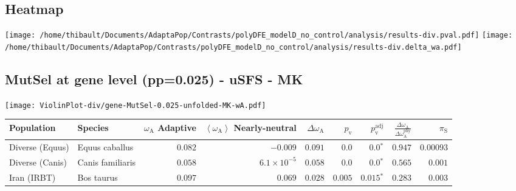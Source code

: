 \subsection{Heatmap} 
\begin{center}
\texttt{[image: /home/thibault/Documents/AdaptaPop/Contrasts/polyDFE\_modelD\_no\_control/analysis/results-div.pval.pdf]} 
\texttt{[image: /home/thibault/Documents/AdaptaPop/Contrasts/polyDFE\_modelD\_no\_control/analysis/results-div.delta\_wa.pdf]} 
\end{center}
\subsection{MutSel at gene level (pp=0.025) - uSFS - MK} 
\begin{center}
\texttt{[image: ViolinPlot-div/gene-MutSel-0.025-unfolded-MK-wA.pdf]} 
\begin{adjustbox}{width = 1\textwidth}
\begin{tabular}{|l|l|r|r|r|r|r|r|r|}
\toprule
                     Population &              Species & \specialcell{$\omega_{\mathrm{A}}$ \\ Adaptive} & \specialcell{$\left< \omega_{\mathrm{A}} \right>$ \\ Nearly-neutral} & $\Delta \omega_{\mathrm{A}} $ & $p_{\mathrm{v}}$ & $p_{\mathrm{v}}^{\mathrm{adj}}$ & $\frac{\Delta\omega_{\mathrm{A}}}{\Delta\omega_{\mathrm{A}}^{\mathrm{phy}}}$ & $\pi_{\textrm{S}}$ \\
\midrule
                Diverse (Equus) &       Equus caballus &                                        $ 0.082$ &                                           $-0.009$ &                      $ 0.091$ &            $0.0$ &                  $\bm{0.0{^*}}$ &                                           $ 0.947$ &          $0.00093$ \\
                Diverse (Canis) &     Canis familiaris &                                        $ 0.058$ &                                $6.1\times 10^{-5}$ &                      $ 0.058$ &            $0.0$ &                  $\bm{0.0{^*}}$ &                                           $ 0.565$ &           $ 0.001$ \\
                    Iran (IRBT) &           Bos taurus &                                        $ 0.097$ &                                           $ 0.069$ &                      $ 0.028$ &         $ 0.005$ &               $\bm{ 0.015{^*}}$ &                                           $ 0.283$ &           $ 0.003$ \\

\end{tabular}
\end{adjustbox}
\end{center}
